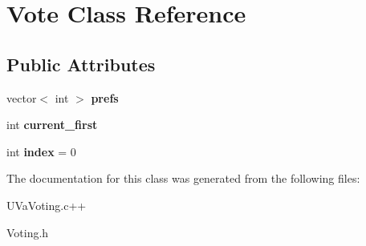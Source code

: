 \hypertarget{classVote}{\section{Vote Class Reference}
\label{classVote}
}
\subsection*{Public Attributes}
\begin{DoxyCompactItemize}
\item 
\hypertarget{classVote_ac268af54952880f8db3dc6df3dc31171}{vector$<$ int $>$ {\bfseries prefs}}\label{classVote_ac268af54952880f8db3dc6df3dc31171}

\item 
\hypertarget{classVote_abea9a71fb79bf06f5881b3a406fa53ae}{int {\bfseries current\-\_\-first}}\label{classVote_abea9a71fb79bf06f5881b3a406fa53ae}

\item 
\hypertarget{classVote_afeeb4a82301b75c007a1dd9f0ee3caf0}{int {\bfseries index} = 0}\label{classVote_afeeb4a82301b75c007a1dd9f0ee3caf0}

\end{DoxyCompactItemize}


The documentation for this class was generated from the following files\-:\begin{DoxyCompactItemize}
\item 
U\-Va\-Voting.\-c++\item 
Voting.\-h\end{DoxyCompactItemize}
